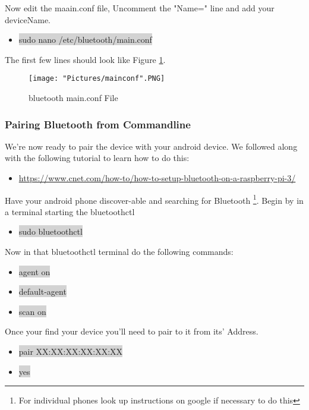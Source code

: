 \documentclass[12pt]{article}
\begin{document}
\noindent Now edit the maain.conf file, Uncomment the "Name=" line and add your deviceName. 
\begin{itemize}
	\item[] \colorbox{lightgray}{sudo nano /etc/bluetooth/main.conf} 
\end{itemize}

\noindent The first few lines should look like Figure \ref{conf}.

\begin{figure}[H]
 	\centering
	\texttt{[image: "Pictures/mainconf".PNG]}
	\caption{bluetooth main.conf File}
	\label{conf}
\end{figure}

\subsubsection{Pairing Bluetooth from Commandline}
We're now ready to pair the device with your android device. We followed along with the following tutorial to learn how to do this:

\begin{itemize}
	\item \href{https://www.cnet.com/how-to/how-to-setup-bluetooth-on-a-raspberry-pi-3/}{https://www.cnet.com/how-to/how-to-setup-bluetooth-on-a-raspberry-pi-3/}
\end{itemize}

Have your android phone discover-able and searching for Bluetooth \footnote{For individual phones look up instructions on google if necessary to do this}. Begin by in a terminal starting the bluetoothctl
\begin{itemize}
	\item[] \colorbox{lightgray}{sudo bluetoothctl}
\end{itemize}

\noindent Now in that bluetoothctl terminal do the following commands:

\begin{itemize}
	\item[] \colorbox{lightgray}{agent on}
	\item[] \colorbox{lightgray}{default-agent}
	\item[] \colorbox{lightgray}{scan on}
\end{itemize}

\noindent Once your find your device you'll need to pair to it from its' Address.

\begin{itemize} 	
	\item[] \colorbox{lightgray}{pair XX:XX:XX:XX:XX:XX} 
	\item[] \colorbox{lightgray}{yes}
\end{itemize}
	
\end{document}
